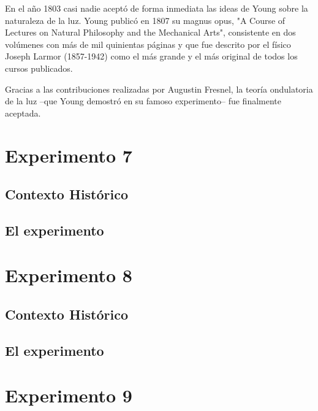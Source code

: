\documentclass[journal]{IEEEtran}
\begin{document}
En el año 1803 casi nadie aceptó de forma inmediata las ideas de Young sobre la naturaleza de la luz. Young publicó en 1807 su magnus opus, "A Course of Lectures on Natural Philosophy and the Mechanical Arts", consistente en dos volúmenes con más de mil quinientas páginas y que fue descrito por el físico Joseph Larmor (1857-1942) como el más grande y el más original de todos los cursos publicados.

Gracias a las contribuciones realizadas por Augustin Fresnel, la teoría ondulatoria de la luz –que Young demostró en su famoso experimento– fue finalmente aceptada.






\section{Experimento 7}

\subsection{Contexto Histórico}

\subsection{El experimento}









\section{Experimento 8}

\subsection{Contexto Histórico}

\subsection{El experimento}







\section{Experimento 9}
\end{document}
